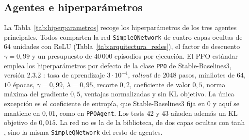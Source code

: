\subsection{Agentes e hiperparámetros}
La Tabla~\ref{tab:hiperparametros} recoge los hiperparámetros de los tres
agentes principales. Todos comparten la red \texttt{SimpleQNetwork} de
cuatro capas ocultas de $64$ unidades con ReLU
(Tabla~\ref{tab:arquitectura_redes}), el factor de descuento
$\gamma = 0{,}99$ y un presupuesto de $40\,000$ episodios por ejecución.
El PPO estándar emplea los hiperparámetros por defecto de la clase
\texttt{PPO} de Stable-Baselines3, versión 2.3.2
\citep{raffin2021stable,raffin2024stableppo}: tasa de aprendizaje
$3 \cdot 10^{-4}$, \textit{rollout} de $2048$ pasos, minilotes de $64$,
$10$ épocas, $\gamma = 0{,}99$, $\lambda = 0{,}95$, recorte $0{,}2$,
coeficiente de valor $0{,}5$, norma máxima del gradiente $0{,}5$,
ventajas normalizadas y sin KL objetivo. La única excepción es el
coeficiente de entropía, que Stable-Baselines3 fija en $0$ y aquí se
mantiene en $0{,}01$, como en \texttt{PPOAgent}. Los tests 42 y 43
añaden además un KL objetivo de $0{,}015$. La red no es la de la
biblioteca, de dos capas ocultas con tanh \citep{raffin2024stablepolicies},
sino la misma \texttt{SimpleQNetwork} del resto de agentes.

